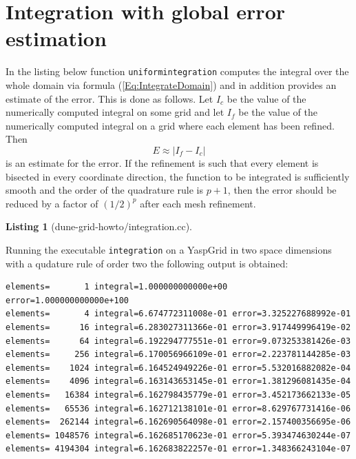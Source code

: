 \documentclass[11pt,a4paper,headinclude,footinclude,DIV16,normalheadings]{scrreprt}
\newtheorem{lst}{Listing}
\begin{document}
\section{Integration with global error estimation}

In the listing below function \lstinline!uniformintegration!
computes the integral over the whole domain via formula
(\ref{Eq:IntegrateDomain}) and in addition provides an estimate of the
error. This is done as follows. Let $I_c$ be the value of the numerically
computed integral on some grid and let $I_f$ be the value of the
numerically computed integral on a grid where each element has been
refined. Then 
\begin{equation}
\label{Eq:GlobalError}
E \approx |I_f-I_c|
\end{equation}
is an estimate for the error. If
the refinement is such that every element is bisected in every
coordinate direction, the function to be integrated is sufficiently
smooth and the order of the quadrature rule is $p+1$,
then the error should be reduced by a factor of $(1/2)^p$ after
each mesh refinement. 

\begin{lst}[dune-grid-howto/integration.cc] \mbox{}


\end{lst}

Running the executable \lstinline!integration! on a YaspGrid in two
space dimensions with a qudature rule of order
two the following output is obtained:

\begin{lstlisting}[basicstyle=\ttfamily\scriptsize]
elements=       1 integral=1.000000000000e+00 error=1.000000000000e+100
elements=       4 integral=6.674772311008e-01 error=3.325227688992e-01
elements=      16 integral=6.283027311366e-01 error=3.917449996419e-02
elements=      64 integral=6.192294777551e-01 error=9.073253381426e-03
elements=     256 integral=6.170056966109e-01 error=2.223781144285e-03
elements=    1024 integral=6.164524949226e-01 error=5.532016882082e-04
elements=    4096 integral=6.163143653145e-01 error=1.381296081435e-04
elements=   16384 integral=6.162798435779e-01 error=3.452173662133e-05
elements=   65536 integral=6.162712138101e-01 error=8.629767731416e-06
elements=  262144 integral=6.162690564098e-01 error=2.157400356695e-06
elements= 1048576 integral=6.162685170623e-01 error=5.393474630244e-07
elements= 4194304 integral=6.162683822257e-01 error=1.348366243104e-07
\end{lstlisting}
\end{document}
